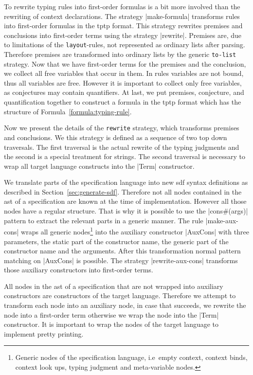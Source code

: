 To rewrite typing rules into first-order formulas is a bit more
involved than the rewriting of context declarations. The strategy
\code|make-formula| transforms rules into first-order formulas in the
\gls{tptp} format. This strategy rewrites premises and conclusions
into first-order terms using the strategy \code|rewrite|. Premises
are, due to limitations of the \texttt{layout}-rules, not represented
as ordinary lists after parsing. Therefore premises are transformed
into ordinary lists by the generic \texttt{to-list} strategy. Now that
we have first-order terms for the premises and the conclusion, we
collect all free variables that occur in them. In rules variables are
not bound, thus all variables are free. However it is important to
collect only free variables, as conjectures may contain
quantifiers. At last, we put premises, conjecture, and quantification
together to construct a formula in the \gls{tptp} format which has the
structure of Formula~\ref{formula:typing-rule}.

Now we present the details of the \texttt{rewrite} strategy, which
transforms premises and conclusions. We this strategy is defined as a
sequence of two top down traversals. The first traversal is the actual
rewrite of the typing judgments and the second is a special treatment
for strings. The second traversal is necessary to wrap all target
language constructs into the \code|Term| constructor.

We translate parts of the specification language into new \gls{sdf}
syntax definitions as described in
Section~\ref{sec:generate-sdf}. Therefore not all nodes contained in
the \gls{ast} of a specification are known at the time of
implementation. However all those nodes have a regular structure. That
is why it is possible to use the \code|cons#(args)| pattern to extract
the relevant parts in a generic manner. The rule \code|make-aux-cons|
wraps all generic nodes\footnote{Generic nodes of the specification
  language, i.e\ empty context, context binds, context look ups,
  typing judgment and meta-variable nodes.} into the auxiliary
constructor \code|AuxCons| with three parameters, the static part of
the constructor name, the generic part of the constructor name and the
arguments. After this transformation normal pattern matching on
\code|AuxCons| is possible. The strategy \code|rewrite-aux-cons|
transforms those auxiliary constructors into first-order terms.

All nodes in the \gls{ast} of a specification that are not wrapped
into auxiliary constructors are constructors of the target
language. Therefore we attempt to transform each node into an
auxiliary node, in case that succeeds, we rewrite the node into a
first-order term otherwise we wrap the node into the \code|Term|
constructor. It is important to wrap the nodes of the target language
to implement pretty printing.

